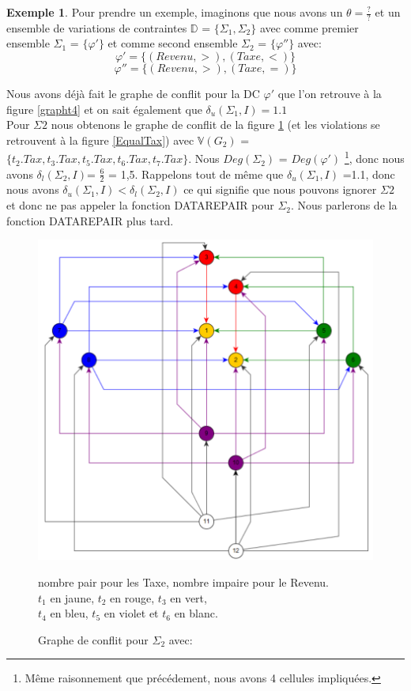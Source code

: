 \documentclass[letterpaper, 12pt]{report}
\theoremstyle{definition}
\newtheorem{myexample}{Exemple}
\begin{document}
\begin{myexample}

Pour prendre un exemple, imaginons que nous avons un $\theta = \frac{?}{?}$ et un ensemble de variations de contraintes $\mathbb{D}$ = $\{\Sigma_1,\Sigma_2\}$ avec comme premier ensemble $\Sigma_1$ = $\{\varphi'\}$ et comme second ensemble $\Sigma_2$ = $\{\varphi''\}$ avec:
$$ \varphi' = \{(Revenu,>),(Taxe,<) \} $$
$$ \varphi'' = \{(Revenu,>),(Taxe,=) \} $$

Nous avons déjà fait le graphe de conflit pour la DC $\varphi'$ que l'on retrouve à la figure \ref{grapht4} et on sait également que $\delta_u(\Sigma_1,I) =1.1$\\

Pour $\Sigma2$ nous obtenons le graphe de conflit de la figure \ref{graphSigma2} (et les violations se retrouvent à la figure \ref{EqualTax}) avec $\mathbb{V}(G_2)$ = $\{ t_2.Tax,t_3.Tax,t_5.Tax,t_6.Tax,t_7.Tax\}$. Nous $Deg(\Sigma_2)$ = $Deg(\varphi')$ \footnote{Même raisonnement que précédement, nous avons 4 cellules impliquées.}, donc nous avons $\delta_l(\Sigma_2,I)$= $\frac{6}{2}$ = 1,5. Rappelons tout de même que $\delta_u(\Sigma_1,I)$ =1.1, donc nous avons $\delta_u(\Sigma_1,I) < \delta_l(\Sigma_2,I)$ ce qui signifie que nous pouvons ignorer $\Sigma2$ et donc ne pas appeler la fonction DATAREPAIR pour $\Sigma_2$. Nous parlerons de la fonction DATAREPAIR plus tard.



\begin{figure}
\centering
\hspace*{-1.8cm} \includegraphics[scale=0.565]{img/graph2}
\caption{\label{graphSigma2}Graphe de conflit pour $\Sigma_2$ avec:}
	nombre pair pour les Taxe, nombre impaire pour le Revenu. \\
	$t_1$ en jaune, $t_2$ en rouge, $t_3$ en vert,\\
	$t_4$ en bleu, $t_5$ en violet et $t_6$ en blanc.
\end{figure}


\end{myexample}
\end{document}
